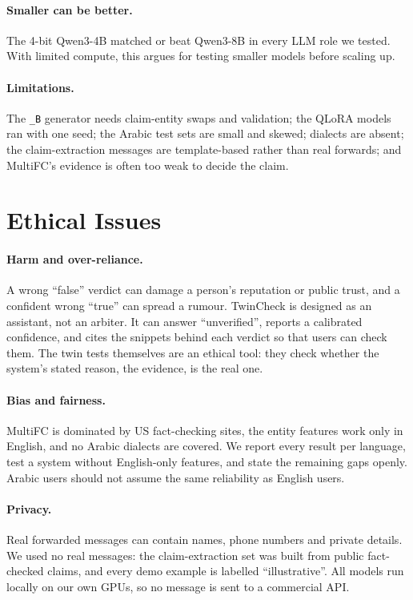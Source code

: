 \documentclass[11pt,a4paper]{article}
\newcommand{\tw}[1]{\texttt{\_#1}}          %
\begin{document}
\paragraph{Smaller can be better.}
The 4-bit Qwen3-4B matched or beat Qwen3-8B in every LLM role we tested. With limited compute, this argues for testing smaller models before scaling up.

\paragraph{Limitations.}
The \tw{B} generator needs claim-entity swaps and validation; the QLoRA models ran with one seed; the Arabic test sets are small and skewed; dialects are absent; the claim-extraction messages are template-based rather than real forwards; and MultiFC's evidence is often too weak to decide the claim.

\section{Ethical Issues}

\paragraph{Harm and over-reliance.}
A wrong ``false'' verdict can damage a person's reputation or public trust, and a confident wrong ``true'' can spread a rumour. TwinCheck is designed as an assistant, not an arbiter. It can answer ``unverified'', reports a calibrated confidence, and cites the snippets behind each verdict so that users can check them. The twin tests themselves are an ethical tool: they check whether the system's stated reason, the evidence, is the real one.

\paragraph{Bias and fairness.}
MultiFC is dominated by US fact-checking sites, the entity features work only in English, and no Arabic dialects are covered. We report every result per language, test a system without English-only features, and state the remaining gaps openly. Arabic users should not assume the same reliability as English users.

\paragraph{Privacy.}
Real forwarded messages can contain names, phone numbers and private details. We used no real messages: the claim-extraction set was built from public fact-checked claims, and every demo example is labelled ``illustrative''. All models run locally on our own GPUs, so no message is sent to a commercial API.
\end{document}
